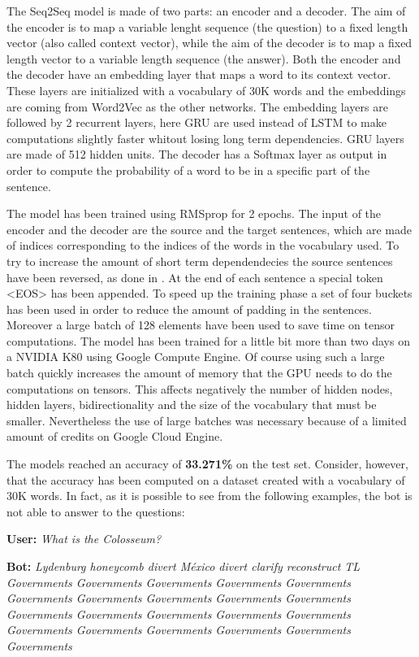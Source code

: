 \documentclass[paper=a4, fontsize=11pt]{scrartcl} %
\numberwithin{equation}{section} %
\numberwithin{figure}{section} %
\numberwithin{table}{section} %
\theoremstyle{definition}
\begin{document}
The Seq2Seq model is made of two parts: an encoder and a decoder. The aim of
the encoder is to map a variable lenght sequence (the question) to a fixed
length vector (also called context vector), while
the aim of the decoder is to map a fixed length vector to a variable length
sequence (the answer). Both the encoder and the decoder have an embedding
layer that maps a word to its context vector. These layers are initialized
with a vocabulary of 30K words and the embeddings are coming from Word2Vec as
the other networks. The embedding layers are followed by 2 recurrent layers, here
GRU are used instead of LSTM to make computations slightly faster whitout losing
long term dependencies. GRU layers are made of 512 hidden units.
The decoder has a Softmax layer as output in order to compute
the probability of a word to be in a specific part of the sentence.

The model has been trained using RMSprop for 2 epochs. The input of the encoder and the
decoder are the source and the target sentences, which are made of indices
corresponding to the indices of the words in the vocabulary used. To try to
increase the amount of short term dependendecies the source sentences have
been reversed, as done in \cite{Sutskever:2014:SSL:2969033.2969173}. At the end
of each sentence a special token <EOS> has been appended. To speed up the training
phase a set of four buckets has been used in order to reduce the amount of
padding in the sentences. Moreover a large batch of 128 elements have been
used to save time on tensor computations. The model has been trained
for a little bit more than two days on a NVIDIA K80 using Google Compute Engine.
Of course using such a large batch quickly increases the amount of memory that
the GPU needs to do the computations on tensors. This affects negatively the number of
hidden nodes, hidden layers, bidirectionality and the size of the vocabulary that
must be smaller. Nevertheless the use of large batches was necessary because
of a limited amount of credits on Google Cloud Engine.

The models reached an accuracy of \textbf{33.271\%} on the test set. Consider, however,
that the accuracy has been computed on a dataset created with a vocabulary of
30K words. In fact, as it is possible to see from the following examples, the
bot is not able to answer to the questions:

\textbf{User:} \textit{What is the Colosseum?}

\textbf{Bot:} \textit{Lydenburg honeycomb divert M\'{e}xico divert clarify reconstruct TL Governments Governments Governments Governments Governments Governments Governments Governments Governments Governments Governments Governments Governments Governments Governments Governments Governments Governments Governments Governments Governments}
\end{document}
